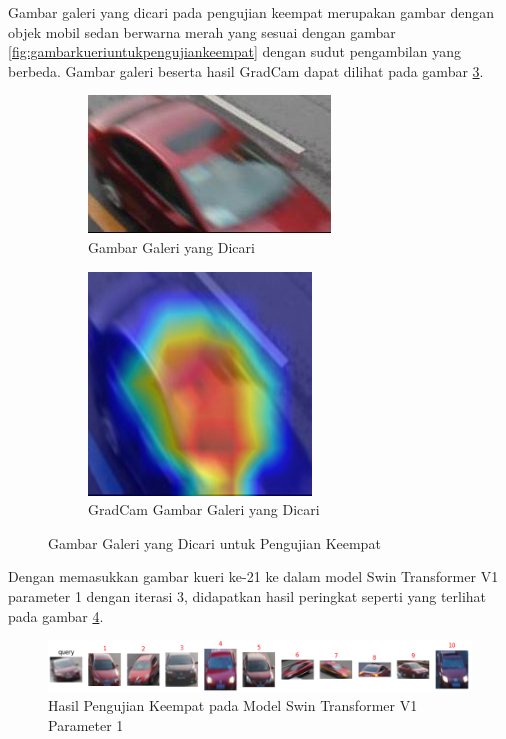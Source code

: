 Gambar galeri yang dicari pada pengujian keempat merupakan gambar dengan objek \linebreak mobil sedan berwarna merah 
yang sesuai dengan gambar \ref{fig:gambarkueriuntukpengujiankeempat} dengan sudut pengambilan yang berbeda. 
Gambar galeri beserta hasil GradCam dapat dilihat pada gambar \ref{fig:gambargaleriuntukpengujiankeempat}.

\begin{figure}[h!]
  \centering
  \begin{subfigure}{.5\textwidth}
    \centering
    \includegraphics[width=.4\linewidth]{gambar/Gal21_1046.jpg}
    \caption{Gambar Galeri yang Dicari}
    \label{gambargalerinomorduasatu}
  \end{subfigure}%
  \begin{subfigure}{.5\textwidth}
    \centering
    \includegraphics[width=.4\linewidth]{gambar/GradCamGal21_1046.jpg}
    \caption{GradCam Gambar Galeri yang Dicari}
    \label{gradcamgambargalerinomorduasatu}
  \end{subfigure}
  \caption{Gambar Galeri yang Dicari untuk Pengujian Keempat}
  \label{fig:gambargaleriuntukpengujiankeempat}
\end{figure}

Dengan memasukkan gambar kueri ke-21 ke dalam model Swin Transformer V1 parameter 1 dengan iterasi 3, didapatkan hasil 
peringkat seperti yang terlihat pada gambar \ref{fig:hasilpengujiankeempatpadamodelswintransformerv1param1}.

\begin{figure}[h!]
  \centering
  \includegraphics[scale=0.6]{gambar/Que21V1P1IT3.png}
  \caption{Hasil Pengujian Keempat pada Model Swin Transformer V1 Parameter 1}
  \label{fig:hasilpengujiankeempatpadamodelswintransformerv1param1}
\end{figure}

